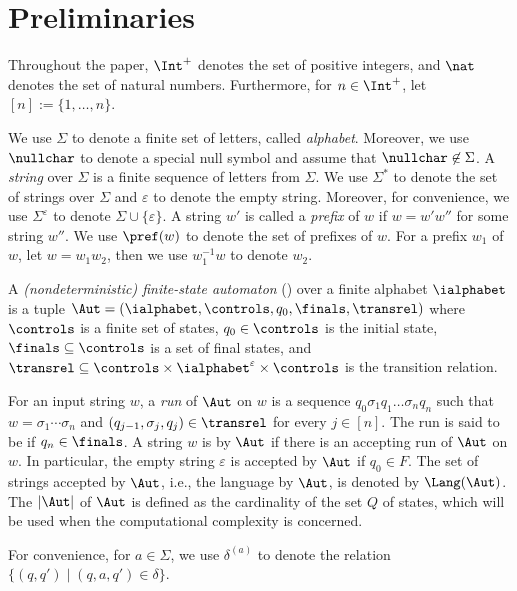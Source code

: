 
\section{Preliminaries}\label{sec:prel}

Throughout the paper, $\Int^+$ denotes the set of positive integers, and  $\nat$ denotes the set of natural numbers. Furthermore, for $n\in \Int^+$, let $[n]:=\{1, \ldots, n\}$. 

We use $\Sigma$ to denote a finite set of letters, called \emph{alphabet}. Moreover, we use $\nullchar$ to denote a special null symbol and assume that  $\nullchar \not \in \Sigma$. 
A \emph{string} over $\Sigma$ is a finite sequence of letters from $\Sigma$. We use $\Sigma^*$ to denote the set of strings over $\Sigma$ and $\varepsilon$ to denote the empty string. Moreover, for convenience, we use $\Sigma^\varepsilon$ to denote $\Sigma \cup \{\varepsilon\}$. A string $w'$ is called a \emph{prefix} of $w$ if $w = w'w''$ for some string $w''$. We use $\pref(w)$ to denote the set of prefixes of $w$. For a prefix $w_1$ of $w$, let $w = w_1 w_2$, then we use $w_1^{-1}w$ to denote $w_2$.

\begin{definition} \label{def:nfa}
	A \emph{(nondeterministic) finite-state automaton}
	(\FA{}) over a finite alphabet $\ialphabet$ is a tuple $\Aut =
	(\ialphabet, \controls, q_0, \finals, \transrel)$ where 
	$\controls$ is a finite set of 
	states, $q_0\in \controls$ is
	the initial state, $\finals\subseteq \controls$ is a set of final states, and 
	$\transrel\subseteq \controls \times 
	\ialphabet^\varepsilon \times  \controls$ is the
	transition relation. 
\end{definition}

For an input string $w$, a \emph{run} of $\Aut$ on $w$
is a sequence $q_0 \sigma_1 q_1 \ldots \sigma_n q_n$ such that $w = \sigma_1 \cdots \sigma_n$ and $(q_{j-1}, \sigma_{j}, q_{j}) \in
\transrel$ for every $j \in [n]$.
The run is said to be  if $q_n \in \finals$.
A string $w$ is  by $\Aut$ if there is an accepting run of
$\Aut$ on $w$. In particular, the empty string $\varepsilon$ is accepted by $\Aut$ if $q_0 \in F$. The set of strings accepted by $\Aut$, i.e., the language  by $\Aut$, is denoted by $\Lang(\Aut)$.
The  $|\Aut|$ of $\Aut$ is defined as the cardinality of the set $Q$ of states, which will be 
used when the computational complexity is concerned.

For convenience, for $a \in \Sigma$, we use $\delta^{(a)}$ to denote the  relation $\{(q, q') \mid (q, a, q') \in \delta\}$.